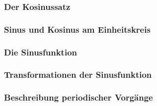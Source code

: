 \documentclass{article}
\begin{document}
\subsubsection*{Der Kosinussatz}
\subsubsection*{Sinus und Kosinus am Einheitskreis}
\subsubsection*{Die Sinusfunktion}
\subsubsection*{Transformationen der Sinusfunktion}
\subsubsection*{Beschreibung periodischer Vorgänge}
\end{document}
